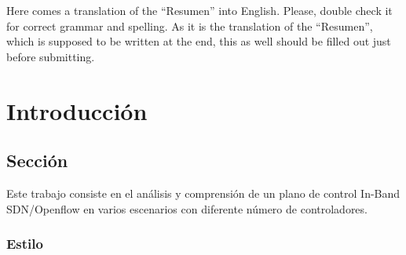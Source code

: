 \documentclass[a4paper, 12pt]{book}
\begin{document}
	Here comes a translation of the ``Resumen'' into English. 
	Please, double check it for correct grammar and spelling.
	As it is the translation of the ``Resumen'', which is supposed to be written at the end, this as well should be filled out just before submitting.
	
	
	
	
	\tableofcontents 
	\cleardoublepage
	\listoffigures %
	
	
	
	\cleardoublepage
	\chapter{Introducción}
	\label{sec:intro} %
	
	
	
	
	\section{Sección}
	\label{sec:seccion}
	
	Este trabajo consiste en el análisis y comprensión de un plano de control In-Band SDN/Openflow en varios escenarios con diferente número de controladores.
	

	
	\subsection{Estilo}
	\label{subsec:estilo}
	
\end{document}
